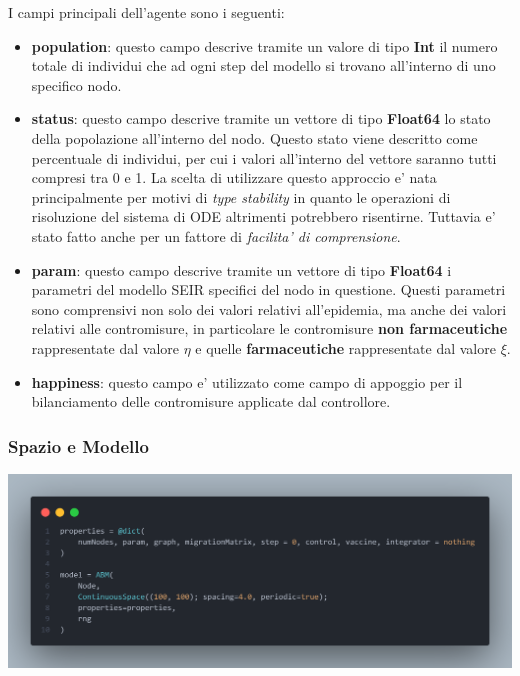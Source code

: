 I campi principali dell'agente sono i seguenti:
\begin{itemize}
	\item \textbf{population}: questo campo descrive tramite un valore di tipo \textbf{Int}
	il numero totale di individui che ad ogni step del modello si trovano all'interno di uno 
	specifico nodo. 
	\item \textbf{status}: questo campo descrive tramite un vettore di tipo \textbf{Float64}
	lo stato della popolazione all'interno del nodo. Questo stato viene descritto come 
	percentuale di individui, per cui i valori all'interno del vettore saranno tutti compresi 
	tra 0 e 1. La scelta di utilizzare questo approccio e' nata principalmente per motivi di 
	\emph{type stability} in quanto le operazioni di risoluzione del sistema di ODE altrimenti 
	potrebbero risentirne. Tuttavia e' stato fatto anche per un fattore di \emph{facilita' di comprensione}.
	\item \textbf{param}: questo campo descrive tramite un vettore di tipo \textbf{Float64}
	i parametri del modello SEIR specifici del nodo in questione. Questi parametri sono comprensivi 
	non solo dei valori relativi all'epidemia, ma anche dei valori relativi alle contromisure, 
	in particolare le contromisure \textbf{non farmaceutiche} rappresentate dal valore \textbf{$\eta$}
	e quelle \textbf{farmaceutiche} rappresentate dal valore \textbf{$\xi$}.
	\item \textbf{happiness}: questo campo e' utilizzato come campo di appoggio per il bilanciamento
	delle contromisure applicate dal controllore.
\end{itemize}

\subsubsection{Spazio e Modello}

\begin{minipage}{\linewidth}
    \centering
    \includegraphics[width=\textwidth]{img/sngraph_model.png}
    \label{fig:Model_code}
\end{minipage}

